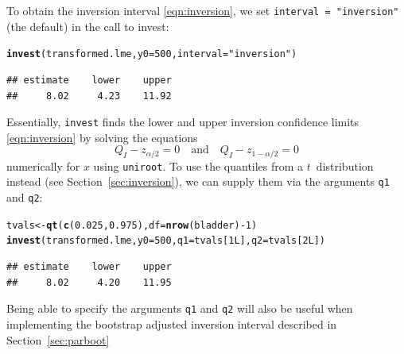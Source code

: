 \documentclass{article}\usepackage[]{graphicx}\usepackage[]{color}
\makeatletter
\newcommand{\hlnum}[1]{\textcolor[rgb]{0.686,0.059,0.569}{#1}}%
\newcommand{\hlstr}[1]{\textcolor[rgb]{0.192,0.494,0.8}{#1}}%
\newcommand{\hlopt}[1]{\textcolor[rgb]{0,0,0}{#1}}%
\newcommand{\hlstd}[1]{\textcolor[rgb]{0.345,0.345,0.345}{#1}}%
\newcommand{\hlkwb}[1]{\textcolor[rgb]{0.69,0.353,0.396}{#1}}%
\newcommand{\hlkwc}[1]{\textcolor[rgb]{0.333,0.667,0.333}{#1}}%
\newcommand{\hlkwd}[1]{\textcolor[rgb]{0.737,0.353,0.396}{\textbf{#1}}}%
\newenvironment{kframe}{%
 \def\at@end@of@kframe{}%
 \ifinner\ifhmode%
  \def\at@end@of@kframe{\end{minipage}}%
  \begin{minipage}{\columnwidth}%
 \fi\fi%
 \def\FrameCommand##1{\hskip\@totalleftmargin \hskip-\fboxsep
 \colorbox{shadecolor}{##1}\hskip-\fboxsep
     \hskip-\linewidth \hskip-\@totalleftmargin \hskip\columnwidth}%
 \MakeFramed {\advance\hsize-\width
   \@totalleftmargin\z@ \linewidth\hsize
   \@setminipage}}%
 {\par\unskip\endMakeFramed%
 \at@end@of@kframe}
\newenvironment{knitrout}{}{} %
\makeatother
\begin{document}
To obtain the inversion interval \eqref{eqn:inversion}, we set \texttt{interval = "inversion"} (the default) in the call to invest:
\begin{knitrout}
\color{fgcolor}\begin{kframe}
\begin{alltt}
\hlkwd{invest}\hlstd{(transformed.lme,} \hlkwc{y0} \hlstd{=} \hlnum{500}\hlstd{,} \hlkwc{interval} \hlstd{=} \hlstr{"inversion"}\hlstd{)}
\end{alltt}
\begin{verbatim}
## estimate    lower    upper 
##     8.02     4.23    11.92
\end{verbatim}
\end{kframe}
\end{knitrout}
Essentially, \texttt{invest} finds the lower and upper inversion confidence limits \eqref{eqn:inversion} by solving the equations
\begin{equation*}
  Q_I - z_{\alpha/2} = 0 \quad \text{and} \quad Q_I - z_{1-\alpha/2} = 0
\end{equation*}
numerically for $x$ using \texttt{uniroot}. To use the quantiles from a $t$~distribution instead (see Section~\ref{sec:inversion}), we can supply them via the arguments \texttt{q1} and \texttt{q2}:
\begin{knitrout}
\color{fgcolor}\begin{kframe}
\begin{alltt}
\hlstd{tvals} \hlkwb{<-} \hlkwd{qt}\hlstd{(}\hlkwd{c}\hlstd{(}\hlnum{0.025}\hlstd{,} \hlnum{0.975}\hlstd{),} \hlkwc{df} \hlstd{=} \hlkwd{nrow}\hlstd{(bladder)} \hlopt{-} \hlnum{1}\hlstd{)}
\hlkwd{invest}\hlstd{(transformed.lme,} \hlkwc{y0} \hlstd{=} \hlnum{500}\hlstd{,} \hlkwc{q1} \hlstd{= tvals[}\hlnum{1L}\hlstd{],} \hlkwc{q2} \hlstd{= tvals[}\hlnum{2L}\hlstd{])}
\end{alltt}
\begin{verbatim}
## estimate    lower    upper 
##     8.02     4.20    11.95
\end{verbatim}
\end{kframe}
\end{knitrout}
Being able to specify the arguments \texttt{q1} and \texttt{q2} will also be useful when implementing the bootstrap adjusted inversion interval described in Section~\ref{sec:parboot}

\end{document}
